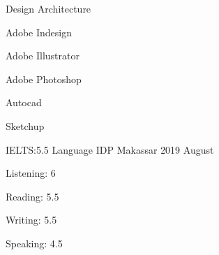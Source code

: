 

\begin{cventries}

  \cventry
  {Design} %
    {Architecture} %
    {} %
    {} %
    {
      \begin{cvitemsplus} %
       {
        \item {Adobe Indesign}
        \item {Adobe Illustrator}
        \item {Adobe Photoshop}
        \item{Autocad}
        \item{Sketchup}
	   }
      \end{cvitemsplus}
    }

  \cventry
  {IELTS:5.5} %
    {Language} %
    {IDP Makassar} %
    {2019 August} %
    {
      \begin{cvitemsplus} %
       {
        \item {Listening: 6}
        \item {Reading: 5.5}
        \item {Writing: 5.5}
        \item {Speaking: 4.5}
	   }
      \end{cvitemsplus}
    }


\end{cventries}
